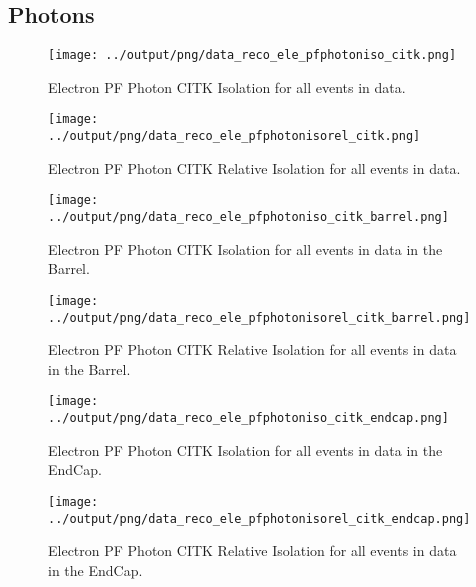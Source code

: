 \documentclass[11pt]{book}
\begin{document}
\subsection{Photons}
\begin{figure}[htb]
\centering
\texttt{[image: ../output/png/data\_reco\_ele\_pfphotoniso\_citk.png]}
\caption{Electron PF Photon CITK Isolation for all events in data.}
\label{fig:data_ele_pfphotoniso_citk}
\end{figure}

\begin{figure}[htb]
\centering
\texttt{[image: ../output/png/data\_reco\_ele\_pfphotonisorel\_citk.png]}
\caption{Electron PF Photon CITK Relative Isolation for all events in data.}
\label{fig:data_ele_pfphotonisorel_citk}
\end{figure}

\begin{figure}[htb]
\centering
\texttt{[image: ../output/png/data\_reco\_ele\_pfphotoniso\_citk\_barrel.png]}
\caption{Electron PF Photon CITK Isolation for all events in data in the Barrel.}
\label{fig:data_ele_pfphotoniso_citk_barrel}
\end{figure}

\begin{figure}[htb]
\centering
\texttt{[image: ../output/png/data\_reco\_ele\_pfphotonisorel\_citk\_barrel.png]}
\caption{Electron PF Photon CITK Relative Isolation for all events in data in the Barrel.}
\label{fig:data_ele_pfphotonisorel_citk_barrel}
\end{figure}

\begin{figure}[htb]
\centering
\texttt{[image: ../output/png/data\_reco\_ele\_pfphotoniso\_citk\_endcap.png]}
\caption{Electron PF Photon CITK Isolation for all events in data in the EndCap.}
\label{fig:data_ele_pfphotoniso_citk_endcap}
\end{figure}

\begin{figure}[htb]
\centering
\texttt{[image: ../output/png/data\_reco\_ele\_pfphotonisorel\_citk\_endcap.png]}
\caption{Electron PF Photon CITK Relative Isolation for all events in data in the EndCap.}
\label{fig:data_ele_pfphotonisorel_citk_endcap}
\end{figure}
\clearpage
\end{document}
